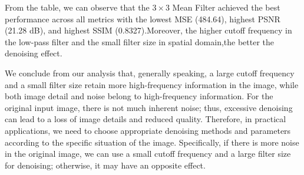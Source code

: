 \documentclass[12pt, a4paper, oneside]{ctexart}
\begin{document}
\noindent From the table, we can observe that the $3\times3$ Mean Filter achieved the best performance across all metrics with the lowest MSE (484.64), highest PSNR (21.28 dB), and highest SSIM (0.8327).Moreover, the higher cutoff frequency in the low-pass filter and the small filter size in spatial domain,the better the denoising effect. 

We conclude from our analysis that, generally speaking, a large cutoff frequency and a small filter size retain more high-frequency information in the image, while both image detail and noise belong to high-frequency information. For the original input image, there is not much inherent noise; thus, excessive denoising can lead to a loss of image details and reduced quality. Therefore, in practical applications, we need to choose appropriate denoising methods and parameters according to the specific situation of the image. Specifically, if there is more noise in the original image, we can use a small cutoff frequency and a large filter size for denoising; otherwise, it may have an opposite effect.


	



\end{document}
